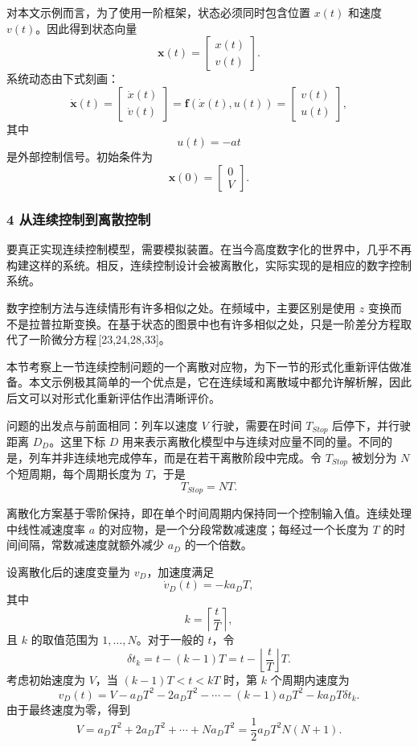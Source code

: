 {\indent 对本文示例而言，为了使用一阶框架，状态必须同时包含位置 $x(t)$ 和速度 $v(t)$。因此得到状态向量
\[
\mathbf{x}(t)=
\begin{bmatrix}
x(t)\\
v(t)
\end{bmatrix}.
\]
系统动态由下式刻画：
\[
\dot{\mathbf{x}}(t)=
\begin{bmatrix}
\dot{x}(t)\\
\dot{v}(t)
\end{bmatrix}
=\mathbf{f}(\dot{x}(t),u(t))
=
\begin{bmatrix}
v(t)\\
u(t)
\end{bmatrix},
\]
其中
\[
u(t)=-at
\]
是外部控制信号。初始条件为
\[
\mathbf{x}(0)=
\begin{bmatrix}
0\\
V
\end{bmatrix}.
\]

\subsubsection*{4 从连续控制到离散控制}

\indent 要真正实现连续控制模型，需要模拟装置。在当今高度数字化的世界中，几乎不再构建这样的系统。相反，连续控制设计会被离散化，实际实现的是相应的数字控制系统。

\indent 数字控制方法与连续情形有许多相似之处。在频域中，主要区别是使用 $z$ 变换而不是拉普拉斯变换。在基于状态的图景中也有许多相似之处，只是一阶差分方程取代了一阶微分方程\,[23,24,28,33]。

\indent 本节考察上一节连续控制问题的一个离散对应物，为下一节的形式化重新评估做准备。本文示例极其简单的一个优点是，它在连续域和离散域中都允许解析解，因此后文可以对形式化重新评估作出清晰评价。

\indent 问题的出发点与前面相同：列车以速度 $V$ 行驶，需要在时间 $T_{Stop}$ 后停下，并行驶距离 $D_D$。这里下标 $D$ 用来表示离散化模型中与连续对应量不同的量。不同的是，列车并非连续地完成停车，而是在若干离散阶段中完成。令 $T_{Stop}$ 被划分为 $N$ 个短周期，每个周期长度为 $T$，于是
\[
T_{Stop}=NT .
\]

\indent 离散化方案基于零阶保持，即在单个时间周期内保持同一个控制输入值。连续处理中线性减速度率 $a$ 的对应物，是一个分段常数减速度；每经过一个长度为 $T$ 的时间间隔，常数减速度就额外减少 $a_D$ 的一个倍数。

\indent 设离散化后的速度变量为 $v_D$，加速度满足
\[
\dot{v}_D(t)=-ka_DT,
\]
其中
\[
k=\left\lceil \frac{t}{T}\right\rceil,
\]
且 $k$ 的取值范围为 $1,\ldots,N$。对于一般的 $t$，令
\[
\delta t_k=t-(k-1)T=t-\left\lfloor \frac{t}{T}\right\rfloor T .
\]
考虑初始速度为 $V$，当 $(k-1)T<t<kT$ 时，第 $k$ 个周期内速度为
\[
v_D(t)=V-a_DT^2-2a_DT^2-\cdots-(k-1)a_DT^2-ka_DT\delta t_k .
\]
由于最终速度为零，得到
\[
V=a_DT^2+2a_DT^2+\cdots+Na_DT^2
=\frac{1}{2}a_DT^2N(N+1).
\]

}
